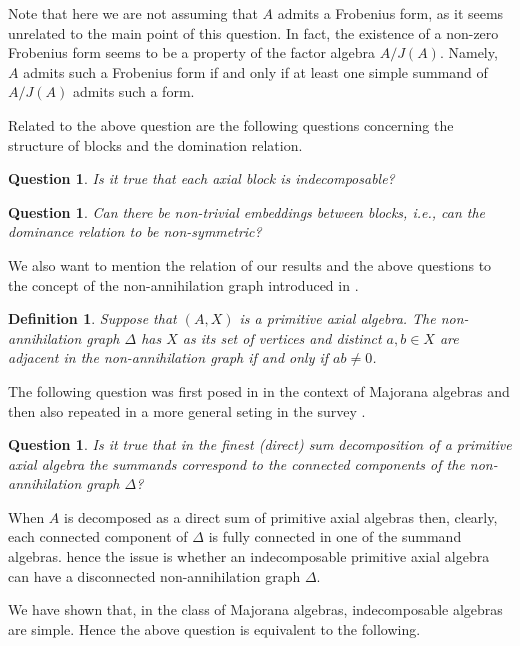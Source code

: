 \documentclass[12pt]{article}
\newtheorem{definition}[theorem]{Definition}
\newtheorem{question}[theorem]{Question}
\newcommand\Dl{\Delta}
\begin{document}
Note that here we are not assuming that $A$ admits a Frobenius form, as it seems 
unrelated to the main point of this question. In fact, the existence of a non-zero 
Frobenius form seems to be a property of the factor algebra $A/J(A)$. Namely, $A$ 
admits such a Frobenius form if and only if at least one simple summand of $A/J(A)$ 
admits such a form.

Related to the above question are the following questions concerning the structure of 
blocks and the domination relation.

\begin{question}
Is it true that each axial block is indecomposable?
\end{question}

\begin{question}
Can there be non-trivial embeddings between blocks, i.e., can the dominance relation 
to be non-symmetric?
\end{question}

We also want to mention the relation of our results and the above questions to the 
concept of the non-annihilation graph introduced in \cite{kms}.

\begin{definition}
Suppose that $(A,X)$ is a primitive axial algebra. The \emph{non-annihilation graph} 
$\Dl$ has $X$ as its set of vertices and distinct $a,b\in X$ are adjacent in the 
non-annihilation graph if and only if $ab\neq 0$.  
\end{definition}

The following question was first posed in \cite{kms} in the context of Majorana 
algebras and then also repeated in a more general seting in the survey \cite{ms}. 

\begin{question}
Is it true that in the finest (direct) sum decomposition of a primitive axial algebra 
the summands correspond to the connected components of the non-annihilation graph 
$\Dl$?
\end{question}

When $A$ is decomposed as a direct sum of primitive axial algebras then, clearly, 
each connected component of $\Dl$ is fully connected in one of the summand algebras. 
hence the issue is whether an indecomposable primitive axial algebra can have a 
disconnected non-annihilation graph $\Dl$.

We have shown that, in the class of Majorana algebras, indecomposable algebras are 
simple. Hence the above question is equivalent to the following.
\end{document}
